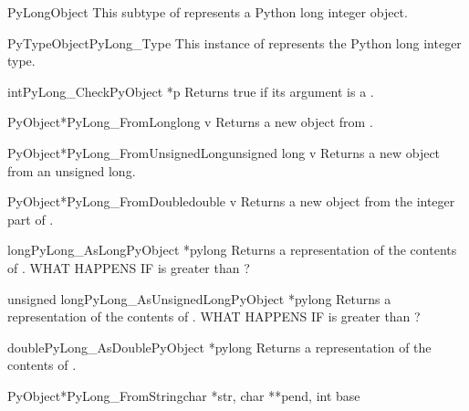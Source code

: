\documentclass{manual}
\begin{document}
\begin{ctypedesc}{PyLongObject}
This subtype of  represents a Python long integer
object.
\end{ctypedesc}

\begin{cvardesc}{PyTypeObject}{PyLong_Type}
This instance of  represents the Python long
integer type.
\end{cvardesc}

\begin{cfuncdesc}{int}{PyLong_Check}{PyObject *p}
Returns true if its argument is a .
\end{cfuncdesc}

\begin{cfuncdesc}{PyObject*}{PyLong_FromLong}{long v}
Returns a new  object from .
\end{cfuncdesc}

\begin{cfuncdesc}{PyObject*}{PyLong_FromUnsignedLong}{unsigned long v}
Returns a new  object from an unsigned \C{} long.
\end{cfuncdesc}

\begin{cfuncdesc}{PyObject*}{PyLong_FromDouble}{double v}
Returns a new  object from the integer part of .
\end{cfuncdesc}

\begin{cfuncdesc}{long}{PyLong_AsLong}{PyObject *pylong}
Returns a \C{}  representation of the contents of .  
WHAT HAPPENS IF  is greater than ?
\end{cfuncdesc}

\begin{cfuncdesc}{unsigned long}{PyLong_AsUnsignedLong}{PyObject *pylong}
Returns a \C{}  representation of the contents of 
.  WHAT HAPPENS IF  is greater than
?
\end{cfuncdesc}

\begin{cfuncdesc}{double}{PyLong_AsDouble}{PyObject *pylong}
Returns a \C{}  representation of the contents of .
\end{cfuncdesc}

\begin{cfuncdesc}{PyObject*}{PyLong_FromString}{char *str, char **pend,
                                                int base}
\end{cfuncdesc}
\end{document}
